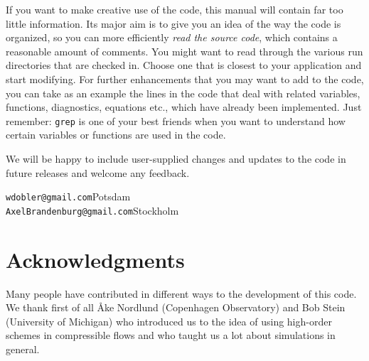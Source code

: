 \documentclass[\mydriver,12pt,twoside,notitlepage,a4paper]{article}
\makeatletter
\newcommand{\code}[1]{\texttt{#1}}
\newcommand{\cmd}{\command}
\newcommand{\email}[1]{\code{#1}}
\newcommand{\command}[2][]{%
  \def\index@{#1}%
  \code{#2}%
  \ifx\index@\@empty\index{#2@\emph{#2}}%
  \else\index{#1@\emph{#1}}%
  \fi%
}
\makeatother
\begin{document}
\bigskip

If you want to make creative use of the code, this manual will contain far
too little information.
Its major aim is to give you an idea of the way the code is organized, so
you can more efficiently \emph{read the source code}, which contains a
reasonable amount of comments.
You might want to read through the various run directories that are checked in.
Choose one that is closest to your application and start modifying.
For further enhancements that you may want to add to the code, you can
take as an example the lines in the code that deal with related variables,
functions, diagnostics, equations etc., which have already been implemented.
Just remember: \cmd{grep} is one of your best friends when you want to
understand how certain variables or functions are used in the code.

\bigskip

We will be happy to include user-supplied changes and updates to the code
in future releases and welcome any feedback.

\vspace{5mm}
\email{wdobler@gmail.com}\hfill Potsdam\\
\email{AxelBrandenburg@gmail.com}\hfill Stockholm


\section*{Acknowledgments}

Many people have contributed in different ways to the development of this
code. We thank first of all {\AA}ke Nordlund (Copenhagen Observatory)
and Bob Stein (University of Michigan) who introduced us to the idea of
using high-order schemes in compressible flows and who taught us a lot
about simulations in general.
\end{document}
